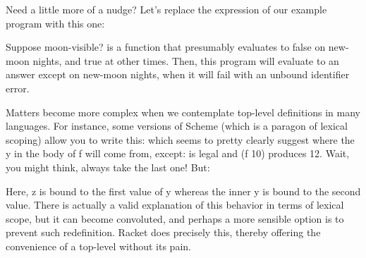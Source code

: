 Need a little more of a nudge? Let’s replace the expression of our example
program with this one:

Suppose moon-visible? is a function that presumably evaluates to false on
new-moon nights, and true at other times. Then, this program will evaluate to an
answer except on new-moon nights, when it will fail with an unbound identifier
error.



Matters become more complex when we contemplate top-level definitions in many
languages. For instance, some versions of Scheme (which is a paragon of lexical
scoping) allow you to write this:
which seems to pretty clearly suggest where the y in the body of f will come
from, except:
is legal and (f 10) produces 12. Wait, you might think, always take the last
one! But:

Here, z is bound to the first value of y whereas the inner y is bound to the
second value. There is actually a valid explanation of this behavior in terms of
lexical scope, but it can become convoluted, and perhaps a more sensible option
is to prevent such redefinition. Racket does precisely this, thereby offering
the convenience of a top-level without its pain.

\secup
